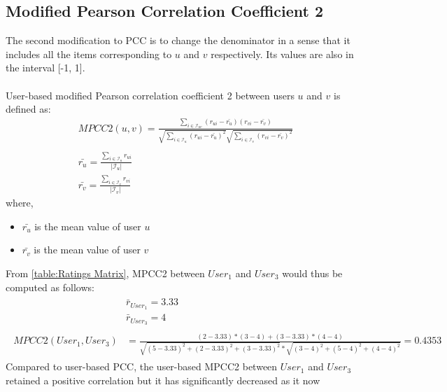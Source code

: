 \subsection{Modified Pearson Correlation Coefficient 2}
The second modification to PCC is to change the denominator
in a sense that it includes all the items corresponding to $u$ and $v$ respectively.
Its values are also in the interval [-1, 1].\\\\
User-based modified Pearson correlation coefficient 2 between users $u$ and $v$ is defined as:
\begin{equation}\label{eq:pearson_2}
\begin{split}
    &MPCC2(u,v) = \frac{\sum_{i \in \mathcal{I}_{uv}}(r_{ui}-\bar{r_{u}})(r_{vi}-\bar{r_{v}})}
                       {\sqrt{\sum_{i \in \mathcal{I}_{u}}(r_{ui}-\bar{r_{u}})^2}
                        \sqrt{\sum_{i \in \mathcal{I}_{v}}(r_{vi}-\bar{r_{v}})^2}} \\\\
    &\bar{r_{u}} = \frac{\sum_{i \in \mathcal{I}_u}r_{ui}}
                        {\mathopen|\mathcal{I}_u\mathclose|}\\
    &\bar{r_{v}} = \frac{\sum_{i \in \mathcal{I}_v}r_{vi}}
                        {\mathopen|\mathcal{I}_v\mathclose|}
\end{split}
\end{equation}
where,
\begin{itemize}
	\item[] $\bar{r_u}$ is the mean value of user $u$
	\item[] $\bar{r_v}$ is the mean value of user $v$
\end{itemize}
From \autoref{table:Ratings Matrix}, MPCC2
between $User_1$ and $User_3$ would thus be computed as follows:
\begin{align*}
	\begin{split}
		&\bar{r}_{User_1} = 3.33\\
		&\bar{r}_{User_3} = 4\\\\
		MPCC2(User_1,User_3) &= \frac{(2 - 3.33) * (3 - 4) + (3 - 3.33) * (4 - 4)}
								  {\sqrt{(5 - 3.33)^2 + (2 - 3.33)^2 + (3 - 3.33)^2} *
								   \sqrt{(3 - 4)^2 + (5 - 4)^2 + (4 - 4)^2}} = 0.4353
	\end{split}
\end{align*}
Compared to user-based PCC, the user-based MPCC2 between $User_1$ and $User_3$
retained a positive correlation but it has significantly decreased as it now
